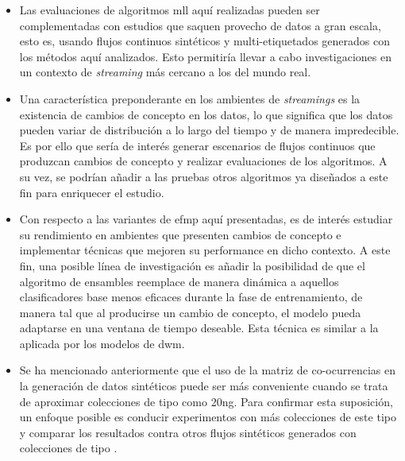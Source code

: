 \begin{itemize}

	\item Las evaluaciones de algoritmos \acrshort{mll} aquí realizadas pueden
	      ser complementadas con estudios que saquen provecho de datos a gran
	      escala, esto es, usando flujos continuos sintéticos y multi-etiquetados
	      generados con los métodos aquí analizados. Esto permitiría llevar a cabo
	      investigaciones en un contexto de \textit{streaming} más cercano a los
	      del mundo real.

	\item Una característica preponderante en los ambientes de
	      \textit{streamings} es la existencia de cambios de concepto en los
	      datos, lo que significa que los datos pueden variar de distribución a
	      lo largo del tiempo y de manera impredecible. Es por ello que sería de
	      interés generar escenarios de flujos continuos que produzcan cambios
	      de concepto y realizar evaluaciones de los algoritmos. A su vez, se
	      podrían añadir a las pruebas otros algoritmos ya diseñados a este fin
	      para enriquecer el estudio.

	\item Con respecto a las variantes de \acrshort{efmp} aquí presentadas, es
	      de interés estudiar su rendimiento en ambientes que presenten cambios
	      de concepto e implementar técnicas que mejoren su performance en dicho
	      contexto. A este fin, una posible línea de investigación es añadir la
	      posibilidad de que el algoritmo de ensambles reemplace de manera
	      dinámica a aquellos clasificadores base menos eficaces durante la fase
	      de entrenamiento, de manera tal que al producirse un cambio de
	      concepto, el modelo pueda adaptarse en una ventana de tiempo deseable.
	      Esta técnica es similar a la aplicada por los modelos de
	      \acrshort{dwm}.

	\item Se ha mencionado anteriormente que el uso de la matriz de
	      co-ocurrencias en la generación de datos sintéticos puede ser más
	      conveniente cuando se trata de aproximar colecciones de tipo
	       como 20ng. Para confirmar esta suposición, un enfoque
	      posible es conducir experimentos con más colecciones de este tipo y
	      comparar los resultados contra otros flujos sintéticos generados con
	      colecciones de tipo .


\end{itemize}
